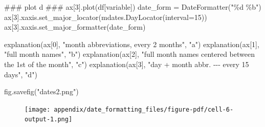 \documentclass[
  letterpaper,
  DIV=11,
  numbers=noendperiod]{scrreprt}
\newenvironment{Shaded}{\begin{snugshade}}{\end{snugshade}}
\newcommand{\AlertTok}[1]{\textcolor[rgb]{0.68,0.00,0.00}{#1}}
\newcommand{\CommentTok}[1]{\textcolor[rgb]{0.37,0.37,0.37}{#1}}
\newcommand{\DecValTok}[1]{\textcolor[rgb]{0.68,0.00,0.00}{#1}}
\newcommand{\NormalTok}[1]{\textcolor[rgb]{0.00,0.23,0.31}{#1}}
\newcommand{\OperatorTok}[1]{\textcolor[rgb]{0.37,0.37,0.37}{#1}}
\newcommand{\SpecialCharTok}[1]{\textcolor[rgb]{0.37,0.37,0.37}{#1}}
\newcommand{\StringTok}[1]{\textcolor[rgb]{0.13,0.47,0.30}{#1}}
\begin{document}
\begin{Shaded}
\begin{Highlighting}[]
\CommentTok{\#\#\# plot d }\AlertTok{\#\#\#}
\NormalTok{ax[}\DecValTok{3}\NormalTok{].plot(df[}\StringTok{\textquotesingle{}variable\textquotesingle{}}\NormalTok{])}
\NormalTok{date\_form }\OperatorTok{=}\NormalTok{ DateFormatter(}\StringTok{"}\SpecialCharTok{\%d}\StringTok{ \%b"}\NormalTok{)}
\NormalTok{ax[}\DecValTok{3}\NormalTok{].xaxis.set\_major\_locator(mdates.DayLocator(interval}\OperatorTok{=}\DecValTok{15}\NormalTok{))}
\NormalTok{ax[}\DecValTok{3}\NormalTok{].xaxis.set\_major\_formatter(date\_form)}

\NormalTok{explanation(ax[}\DecValTok{0}\NormalTok{], }\StringTok{"month abbreviations, every 2 months"}\NormalTok{, }\StringTok{"a"}\NormalTok{)}
\NormalTok{explanation(ax[}\DecValTok{1}\NormalTok{], }\StringTok{"full month names"}\NormalTok{, }\StringTok{"b"}\NormalTok{)}
\NormalTok{explanation(ax[}\DecValTok{2}\NormalTok{], }\StringTok{"full month names centered between the 1st of the month"}\NormalTok{, }\StringTok{"c"}\NormalTok{)}
\NormalTok{explanation(ax[}\DecValTok{3}\NormalTok{], }\StringTok{"day + month abbr. {-}{-}{-} every 15 days"}\NormalTok{, }\StringTok{"d"}\NormalTok{)}

\NormalTok{fig.savefig(}\StringTok{"dates2.png"}\NormalTok{)}
\end{Highlighting}
\end{Shaded}

\begin{figure}[H]

{\centering \texttt{[image: appendix/date\_formatting\_files/figure-pdf/cell-6-output-1.png]}

}

\end{figure}
\end{document}

